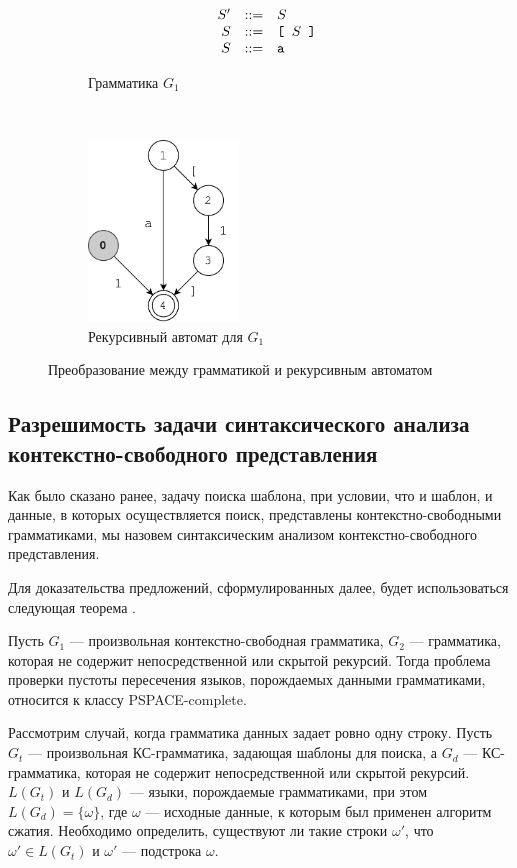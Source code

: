 \begin{figure}[h]
	\centering
	\begin{subfigure}[b]{0.45\textwidth}
		\centering
		$$
		\begin{array}{crcl}
		&S' & ::= & S \\
		&S  & ::= & \texttt{[ } S \texttt{ ]}\\
		&S  & ::= & \mbox{\texttt{a}}
		\end{array}
		$$
		\caption{Грамматика $G_1$}
	\end{subfigure}
	~
	\begin{subfigure}[b]{0.45\textwidth}
		\centering
		\includegraphics[width=4cm]{pictures/ra_example.pdf}
		\caption{Рекурсивный автомат для $G_1$}
	\end{subfigure}
	\caption{Преобразование между грамматикой и рекурсивным автоматом}
	\label{fig:ra_ex}
\end{figure}


\subsection{Разрешимость задачи синтаксического анализа контекстно-свободного представления}
Как было сказано ранее, задачу поиска шаблона, при условии, что и шаблон, и данные, в которых осуществляется поиск, представлены контекстно-свободными грамматиками, мы назовем синтаксическим анализом контекстно-свободного представления. 

Для доказательства предложений, сформулированных далее, будет использоваться следующая теорема \cite{Nederhof}.

\begin{theorem}
	Пусть $G_1$ --- произвольная контекстно-свободная грамматика, $G_2$ --- грамматика, которая не содержит непосредственной или скрытой рекурсий. Тогда проблема проверки пустоты пересечения языков, порождаемых данными грамматиками, относится к классу PSPACE-complete.
\end{theorem}

Рассмотрим случай, когда грамматика данных задает ровно одну строку. Пусть $G_t$ --- произвольная КС-грамматика, задающая шаблоны для поиска, а $G_d$ --- КС-грамматика, которая не содержит непосредственной или скрытой рекурсий. $L(G_t)$ и $L(G_d)$ --- языки, порождаемые грамматиками, при этом $L(G_d) = \{\omega\}$, где $\omega$ --- исходные данные, к которым был применен алгоритм сжатия. 
Необходимо определить, существуют ли такие строки $\omega'$, что $\omega' \in L(G_t)$ и $\omega'$ --- подстрока $\omega$.

